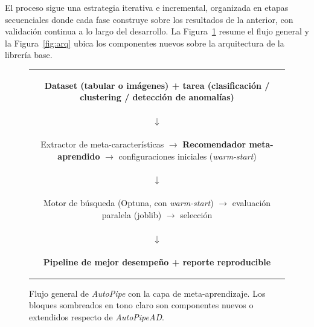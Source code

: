 \documentclass[12pt,letterpaper]{article}
\begin{document}
El proceso sigue una estrategia iterativa e incremental, organizada en etapas secuenciales donde cada fase construye sobre los resultados de la anterior, con validación continua a lo largo del desarrollo. La Figura~\ref{fig:flujo} resume el flujo general y la Figura~\ref{fig:arq} ubica los componentes nuevos sobre la arquitectura de la librería base.

\begin{figure}[H]
\centering
\small
\setlength{\tabcolsep}{4pt}
\begin{tabular}{c}
\colorbox{tablehead}{\parbox{0.95\textwidth}{\centering \textbf{Dataset (tabular o imágenes) + tarea (clasificación / clustering / detección de anomalías)}}}\\[2pt]
$\downarrow$\\[2pt]
\colorbox{tablealt}{\parbox{0.95\textwidth}{\centering Extractor de meta-características $\rightarrow$ \textbf{Recomendador meta-aprendido} $\rightarrow$ configuraciones iniciales (\textit{warm-start})}}\\[2pt]
$\downarrow$\\[2pt]
\colorbox{tablealt}{\parbox{0.95\textwidth}{\centering Motor de búsqueda (Optuna, con \textit{warm-start}) $\rightarrow$ evaluación paralela (joblib) $\rightarrow$ selección}}\\[2pt]
$\downarrow$\\[2pt]
\colorbox{tablehead}{\parbox{0.95\textwidth}{\centering \textbf{Pipeline de mejor desempeño + reporte reproducible}}}
\end{tabular}
\caption{Flujo general de \textit{AutoPipe} con la capa de meta-aprendizaje. Los bloques sombreados en tono claro son componentes nuevos o extendidos respecto de \textit{AutoPipeAD}.}
\label{fig:flujo}
\end{figure}
\end{document}
